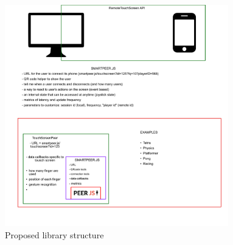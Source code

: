 \documentclass{l4proj}
\begin{document}
\begin{figure}[h!]
    \centering
    \includegraphics[width=9.7cm]{./images/RemoteTouchScreen.png}
    \caption{Proposed library structure}
    \label{fig:libstruct}
\end{figure}
\end{document}
